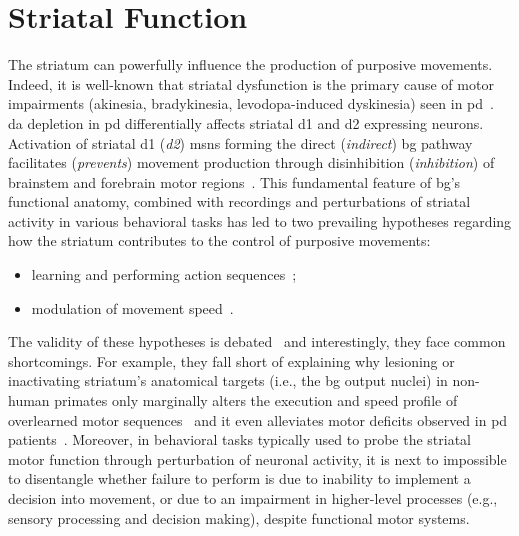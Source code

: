 \section{Striatal Function}
\label{ch:disscusion:lesion}

The striatum can powerfully influence the production of purposive movements.
Indeed, it is well-known that striatal dysfunction is the primary cause of motor impairments (akinesia, bradykinesia, levodopa-induced dyskinesia) seen in \gls{pd}~\cite{Mink1996,Hornykiewicz2006,McGregor2019Neuron}.
\Gls{da} depletion in \gls{pd} differentially affects striatal \gls{d1} and \gls{d2} expressing neurons.
Activation of striatal \gls{d1} (\textit{\gls{d2}}) \glspl{msn} forming the direct (\textit{indirect}) \gls{bg} pathway facilitates (\textit{prevents}) movement production through disinhibition (\textit{inhibition}) of brainstem and forebrain motor regions~\cite{Kravitz2010Nature}.
This fundamental feature of \gls{bg}'s functional anatomy, combined with recordings and perturbations of striatal activity in various behavioral tasks has led to two prevailing hypotheses regarding how the striatum contributes to the control of purposive movements: %
\begin{itemize}[noitemsep]
    \item learning and performing action sequences\footnotemark~\cite{Barnes2005Nature, Jin2010N, Cui2013Nature, Klaus2017Neuron};
    \item  modulation of movement speed~\cite{Kim2014EJN, Rueda2015NN, Barbera2016Neuron, Yttri2016Nature, Panigrahi2015Cell}.
\end{itemize}
The validity of these hypotheses is debated~\cite[for instance, see][]{Dudman2016CurrOpinNeurobiol} and interestingly, they face common shortcomings.
For example, they fall short of explaining why lesioning or inactivating striatum's anatomical targets (i.e., the \gls{bg} output nuclei) in non-human primates only marginally alters the execution and speed profile of overlearned motor sequences~\cite{Desmurget2010JNeurosci} and it even alleviates motor deficits observed in \gls{pd} patients~\cite{Turner2010CurrOpinNeurobiol}.
Moreover, in behavioral tasks typically used to probe the striatal motor function through perturbation of neuronal activity, it is next to impossible to disentangle whether failure to perform is due to inability to implement a decision into movement, or due to an impairment in higher-level processes (e.g., sensory processing and decision making), despite functional motor systems.\footnotemark
